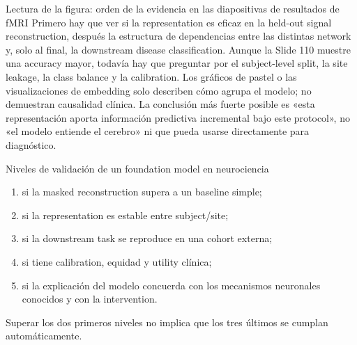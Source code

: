




\begin{knowledgebox}{Lectura de la figura: orden de la evidencia en las diapositivas de resultados de fMRI}
Primero hay que ver si la representation es eficaz en la held-out signal reconstruction, después la estructura de dependencias entre las distintas network y, solo al final, la downstream disease classification. Aunque la Slide 110 muestre una accuracy mayor, todavía hay que preguntar por el subject-level split, la site leakage, la class balance y la calibration. Los gráficos de pastel o las visualizaciones de embedding solo describen cómo agrupa el modelo; no demuestran causalidad clínica. La conclusión más fuerte posible es «esta representación aporta información predictiva incremental bajo este protocol», no «el modelo entiende el cerebro» ni que pueda usarse directamente para diagnóstico.
\end{knowledgebox}


\begin{knowledgebox}{Niveles de validación de un foundation model en neurociencia}
\begin{enumerate}
  \item si la masked reconstruction supera a un baseline simple;
  \item si la representation es estable entre subject/site;
  \item si la downstream task se reproduce en una cohort externa;
  \item si tiene calibration, equidad y utility clínica;
  \item si la explicación del modelo concuerda con los mecanismos neuronales conocidos y con la intervention.
\end{enumerate}
Superar los dos primeros niveles no implica que los tres últimos se cumplan automáticamente.
\end{knowledgebox}

